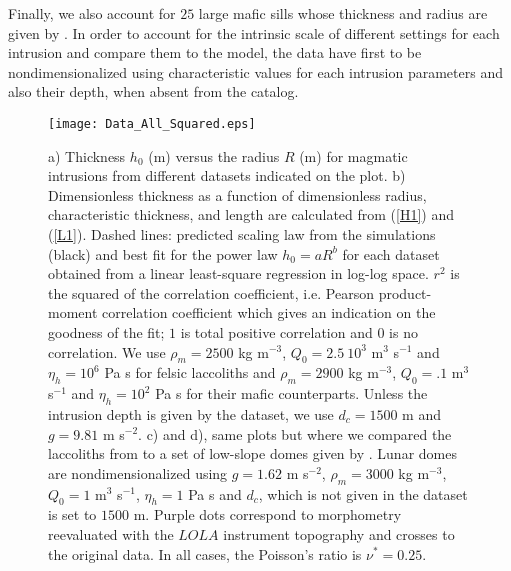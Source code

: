 Finally, we  also account for  $25$ large mafic sills  whose thickness
and radius are given by \citet{Cruden:tg}. In order to account for the
intrinsic scale of  different settings for each  intrusion and compare
them to the model, the data  have first to be nondimensionalized using
characteristic  values for  each intrusion  parameters and  also their
depth, when absent from the catalog.

\begin{figure}[htpb]
  \begin{center}
    \graphicspath{ {/Users/thorey/Documents/These/Projet/Refroidissement/Skin_Model/Figure/Figure_Data/} }
    \texttt{[image: Data\_All\_Squared.eps]}
    \caption{a)  Thickness $h_0$  (m) versus  the radius  $R$ (m)  for
      magmatic  intrusions from  different datasets  indicated on  the
      plot. b) Dimensionless thickness  as a function of dimensionless
      radius, characteristic thickness, and length are calculated from
      (\ref{H1}) and (\ref{L1}).  Dashed  lines: predicted scaling law
      from  the simulations  (black) and  best fit  for the  power law
      $h_0=aR^b$ for each dataset  obtained from a linear least-square
      regression  in  log-log space.   $r^2$  is  the squared  of  the
      correlation coefficient, i.e. Pearson product-moment correlation
      coefficient which  gives an  indication on  the goodness  of the
      fit;  $1$   is  total  positive   correlation  and  $0$   is  no
      correlation.  We use $\rho_m=2500$  kg m$^{-3}$, $Q_0 =2.5~10^3$
      m$^3$ s$^{-1}$ and $\eta_h=10^6$ Pa  s for felsic laccoliths and
      $\rho_m=2900$  kg   m$^{-3}$,  $Q_0  =.1$  m$^3$   s$^{-1}$  and
      $\eta_h=10^2$  Pa s  for their  mafic counterparts.   Unless the
      intrusion depth is given by the dataset, we use $d_c=1500$ m and
      $g=9.81$  m  s$^{-2}$.  c)  and  d),  same  plots but  where  we
      compared the  laccoliths from \citep{Rocchi:2002jy} to  a set of
      low-slope domes given by \citet{Wohler:2009jj}.  Lunar domes are
      nondimensionalized using  $g=1.62$ m s$^{-2}$,  $\rho_m=3000$ kg
      m$^{-3}$, $Q_0  =1$ m$^3$ s$^{-1}$,  $\eta_h=1$ Pa s  and $d_c$,
      which is  not given in  the dataset is  set to $1500$  m. Purple
      dots  correspond  to  morphometry reevaluated  with  the  $LOLA$
      instrument topography and  crosses to the original  data. In all
      cases, the Poisson's ratio is $\nu^*=0.25$.}
    \label{Corry_Rocchie}
  \end{center}
\end{figure}



